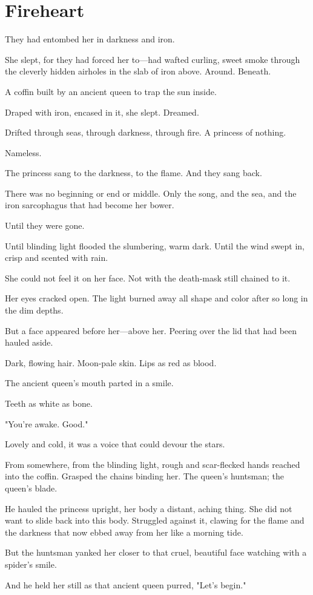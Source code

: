 
\chapter*{Fireheart}

They had entombed her in darkness and iron.

She slept, for they had forced her to---had wafted curling, sweet smoke through the cleverly hidden airholes in the slab of iron above.
Around.
Beneath.

A coffin built by an ancient queen to trap the sun inside.

Draped with iron, encased in it, she slept.
Dreamed.

Drifted through seas, through darkness, through fire.
A princess of nothing.

Nameless.

The princess sang to the darkness, to the flame.
And they sang back.

There was no beginning or end or middle.
Only the song, and the sea, and the iron sarcophagus that had become her bower.

Until they were gone.

Until blinding light flooded the slumbering, warm dark.
Until the wind swept in, crisp and scented with rain.

She could not feel it on her face.
Not with the death-mask still chained to it.

Her eyes cracked open.
The light burned away all shape and color after so long in the dim depths.

But a face appeared before her---above her.
Peering over the lid that had been hauled aside.

Dark, flowing hair.
Moon-pale skin.
Lips as red as blood.

The ancient queen's mouth parted in a smile.

Teeth as white as bone.

"You're awake.
Good."

Lovely and cold, it was a voice that could devour the stars.

From somewhere, from the blinding light, rough and scar-flecked hands reached into the coffin.
Grasped the chains binding her.
The queen's huntsman; the queen's blade.

He hauled the princess upright, her body a distant, aching thing.
She did not want to slide back into this body.
Struggled against it, clawing for the flame and the darkness that now ebbed away from her like a morning tide.

But the huntsman yanked her closer to that cruel, beautiful face watching with a spider's smile.

And he held her still as that ancient queen purred, "Let's begin."

